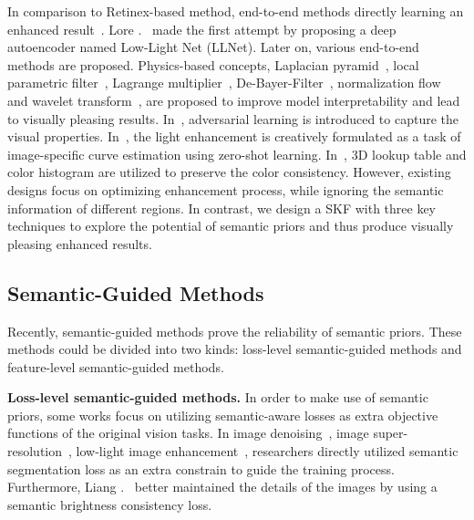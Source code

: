 \documentclass[10pt,twocolumn,letterpaper]{article}
\begin{document}
In comparison to Retinex-based method, end-to-end methods directly learning an enhanced result~\cite{zhu2020eemefn, xu2020learning,lim2020dslr, moran2020deeplpf, zheng2021utvnet, dong2022abandoning, wang2022llflow, fan2022hwmnet, ma2022sci,dudhane2022burst, zamir2022mirnetv2, tu2022maxim, xu2022snr}. Lore \etal.~\cite{lore2017llnet} made the first attempt by proposing a deep autoencoder named Low-Light Net (LLNet). Later on, various end-to-end methods are proposed. Physics-based concepts, \eg Laplacian pyramid~\cite{lim2020dslr}, local parametric filter~\cite{moran2020deeplpf}, Lagrange multiplier~\cite{zheng2021utvnet}, De-Bayer-Filter~\cite{dong2022abandoning}, normalization flow~\cite{wang2022llflow} and wavelet transform~\cite{fan2022hwmnet}, are proposed to improve model interpretability and lead to visually pleasing results. In~\cite{yang2020drbn, jiang2021enlightengan, jin2022nightimage}, adversarial learning is introduced to capture the visual properties. In~\cite{guo2020zerodce}, the light enhancement is creatively formulated as a task of image-specific curve estimation using zero-shot learning. In~\cite{yang2022adaint, kim2022colorhistloss, zhang2022colordccnet}, 3D lookup table and color histogram are utilized to preserve the color consistency. However, existing designs focus on optimizing enhancement process, while ignoring the semantic information of different regions. In contrast, we design a SKF with three key techniques to explore the potential of semantic priors and thus produce visually pleasing enhanced results.

\vspace{-0.1cm}
\subsection{Semantic-Guided Methods}
\vspace{-0.1cm}
Recently, semantic-guided methods prove the reliability of semantic priors. These methods could be divided into two kinds: loss-level semantic-guided methods and feature-level semantic-guided methods. 

\textbf{Loss-level semantic-guided methods.} In order to make use of semantic priors, some works focus on utilizing semantic-aware losses as extra objective functions of the original vision tasks. In image denoising~\cite{liu2018semanticdenoise}, image super-resolution~\cite{aakerberg2022semanticsr}, low-light image enhancement~\cite{zheng2022semanticzeroLLIE}, researchers directly utilized semantic segmentation loss as an extra constrain to guide the training process. Furthermore, Liang \etal.~\cite{liang2022SCLLLE} better maintained the details of the images by using a semantic brightness consistency loss.
\end{document}

